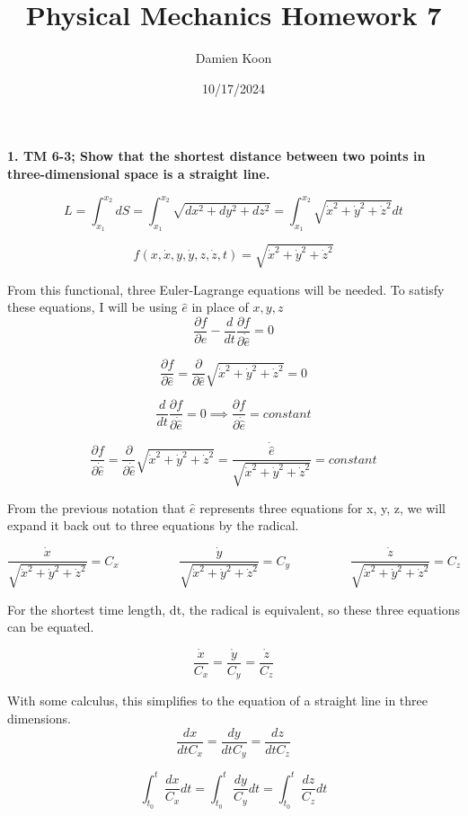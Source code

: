 \documentclass[12pt]{article}
\title{Physical Mechanics Homework 7}
\date{10/17/2024}
\author{Damien Koon}
\begin{document}
\maketitle

\newpage
\textbf{1. TM 6-3; Show that the shortest distance between two points in three-dimensional
space is a straight line.}

$$
L = \int^{x_2}_{x_1} dS = \int^{x_2}_{x_1} \sqrt{dx^2 + dy^2 + dz^2} = \int^{x_2}_{x_1} \sqrt{\dot{x}^2 + \dot{y}^2 + \dot{z}^2} dt
$$

$$
f(x, \dot{x}, y, \dot{y}, z, \dot{z}, t) = \sqrt{\dot{x}^2 + \dot{y}^2 + \dot{z}^2}
$$

From this functional, three Euler-Lagrange equations will be needed. To satisfy these equations, I will be using $\hat{e}$ in place of $x, y, z$
$$
\frac{\partial f}{\partial \hat{e}} - \frac{d}{dt} \frac{\partial f}{\partial \dot{\hat{e}}} = 0
$$

$$
\frac{\partial f}{\partial \hat{e}} = \frac{\partial}{\partial \hat{e}} \sqrt{\dot{x}^2 + \dot{y}^2 + \dot{z}^2} = 0
$$

$$
\frac{d}{dt} \frac{\partial f}{\partial \dot{\hat{e}}} = 0 \implies \frac{\partial f}{\partial \dot{\hat{e}}} = constant
$$

$$
\frac{\partial f}{\partial \dot{\hat{e}}} = \frac{\partial}{\partial \dot{\hat{e}}} \sqrt{\dot{x}^2 + \dot{y}^2 + \dot{z}^2} = \frac{\dot{\hat{e}}}{\sqrt{\dot{x}^2 + \dot{y}^2 + \dot{z}^2}} = constant
$$

From the previous notation that $\hat{e}$ represents three equations for x, y, z, we will expand it back out to three equations by the radical. 

$$
\frac{\dot{x}}{\sqrt{\dot{x}^2 + \dot{y}^2 + \dot{z}^2}} = C_x \hspace{2cm} 
\frac{\dot{y}}{\sqrt{\dot{x}^2 + \dot{y}^2 + \dot{z}^2}} = C_y \hspace{2cm}
\frac{\dot{z}}{\sqrt{\dot{x}^2 + \dot{y}^2 + \dot{z}^2}} = C_z
$$

For the shortest time length, dt, the radical is equivalent, so these three equations can be equated. 

$$
\frac{\dot{x}}{C_x} = \frac{\dot{y}}{C_y} = \frac{\dot{z}}{C_z}
$$

With some calculus, this simplifies to the equation of a straight line in three dimensions.
$$
\frac{dx}{dt C_x} = \frac{dy}{dt C_y} = \frac{dz}{dt C_z}
$$

$$
\int^{t}_{t_0} \frac{dx}{C_x} dt = \int^{t}_{t_0} \frac{dy}{C_y} dt = \int^{t}_{t_0} \frac{dz}{C_z} dt
$$
\end{document}
